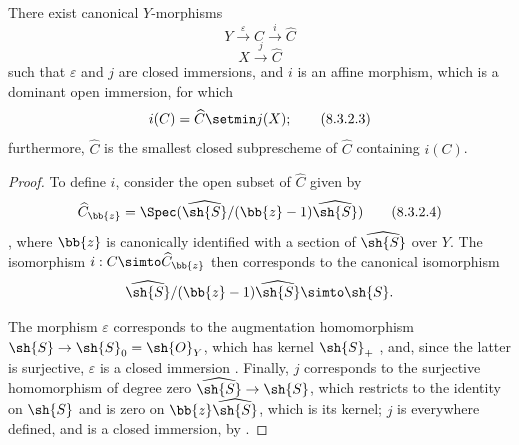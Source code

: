 \begin{proposition}[8.3.2]
\label{II.8.3.2}
There exist canonical $Y$-morphisms
\[
\label{II.8.3.2.1}
  Y \xrightarrow{\varepsilon} C \xrightarrow{i} \widehat{C}
\tag{8.3.2.1}
\]
\[
\label{II.8.3.2.2}
  X \xrightarrow{j} \widehat{C}
\tag{8.3.2.2}
\]
such that $\varepsilon$ and $j$ are closed immersions, and $i$ is an affine morphism, which is a dominant open immersion, for which
\[
\label{II.8.3.2.3}
  i(C) = \widehat{C}\setmin j(X);
\tag{8.3.2.3}
\]
furthermore, $\widehat{C}$ is the smallest closed subprescheme of $\widehat{C}$ containing $i(C)$.
\end{proposition}

\begin{proof}
To define $i$, consider the open subset of $\widehat{C}$ given by
\[
\label{II.8.3.2.4}
  \widehat{C}_{\bb{z}} = \Spec(\widehat{\sh{S}}/(\bb{z}-1)\widehat{\sh{S}})
\tag{8.3.2.4}
\]
, where $\bb{z}$ is canonically identified with a section of $\widehat{\sh{S}}$ over $Y$.
The isomorphism $i: C\simto\widehat{C}_{\bb{z}}$ then corresponds to the canonical isomorphism 
\[
  \widehat{\sh{S}}/(\bb{z}-1)\widehat{\sh{S}} \simto \sh{S}.
\]

The morphism $\varepsilon$ corresponds to the augmentation homomorphism $\sh{S}\to\sh{S}_0=\sh{O}_Y$, which has kernel $\sh{S}_+$ , and, since the latter is surjective, $\varepsilon$ is a closed immersion .
Finally, $j$ corresponds  to the surjective homomorphism of degree zero $\widehat{\sh{S}}\to\sh{S}$, which restricts to the identity on $\sh{S}$ and is zero on $\bb{z}\widehat{\sh{S}}$, which is its kernel;
$j$ is everywhere defined, and is a closed immersion, by .


\end{proof}
